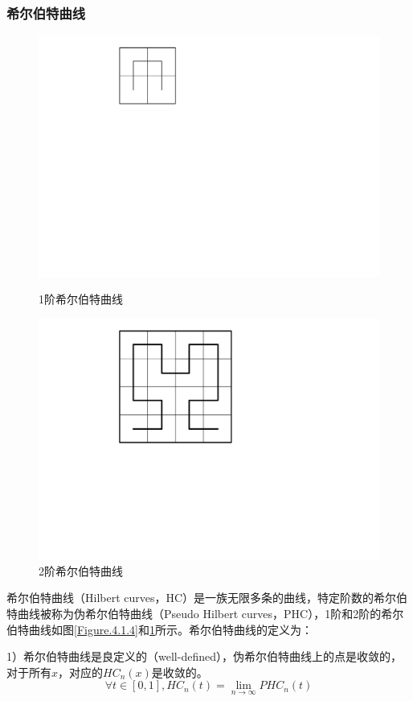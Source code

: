 \documentclass[master]{thesis-uestc}
\begin{document}
\subsubsection{希尔伯特曲线}
\begin{figure}[!ht]
\centering 
\begin{minipage}[b]{0.45\linewidth}
\centering
\includegraphics[width=0.7\linewidth]{./pic/hilbert1.pdf}
\caption{1阶希尔伯特曲线}
\label{Figure.4.1.4}
\end{minipage}
\begin{minipage}[b]{0.45\linewidth} 
\centering 
\includegraphics[width=0.7\linewidth]{./pic/hilbert2.pdf}
\caption{2阶希尔伯特曲线}
\label{Figure.4.1.5}
\end{minipage}
\end{figure}
希尔伯特曲线（Hilbert curves，HC）是一族无限多条的曲线，特定阶数的希尔伯特曲线被称为伪希尔伯特曲线（Pseudo Hilbert curves，PHC），1阶和2阶的希尔伯特曲线如图\ref{Figure.4.1.4}和\ref{Figure.4.1.5}所示。希尔伯特曲线的定义为：

1）希尔伯特曲线是良定义的（well-defined），伪希尔伯特曲线上的点是收敛的，对于所有$x$，对应的$HC_n(x)$是收敛的。
\begin{equation}
\forall t \in [0,1], HC_n(t) = \lim_{n \rightarrow\infty} PHC_n(t)
\end{equation}
\end{document}
